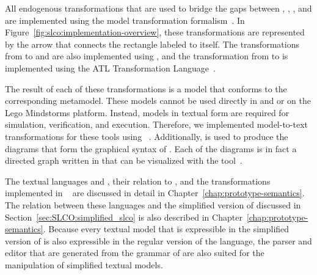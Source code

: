 All endogenous transformations that are used to bridge the gaps between \SLCO, \NQC, \Promela, and \POOSL are implemented using the \Xtend model transformation formalism~\cite{Haase2007OAW}.
In Figure~\ref{fig:slco:implementation-overview}, these transformations are represented by the arrow that connects the rectangle labeled \SLCO to itself.
The transformations from \SLCO to \POOSL and \NQC are also implemented using \Xtend, and the transformation from \SLCO to \Promela is implemented using the ATL Transformation Language~\cite{Jouault2005}.

The result of each of these transformations is a model that conforms to the corresponding metamodel.
These models cannot be used directly in \POOSL and \Spin or on the Lego Mindstorms platform.
Instead, models in textual form are required for simulation, verification, and execution.
Therefore, we implemented model-to-text transformations for these tools using \Xpand~\cite{Haase2007OAW}.
Additionally, \Xpand is used to produce the diagrams that form the graphical syntax of \SLCO.
Each of the diagrams is in fact a directed graph written in \DOT that can be visualized with the \graphviz tool~\cite{Ellson01graphviz}.

The textual languages \CS and \LTS, their relation to \DOT, and the transformations implemented in \ASFSDF~\cite{Brand:2001:ASF} are discussed in detail in Chapter~\ref{chap:prototype-semantics}.
The relation between these languages and the simplified version of \SLCO discussed in Section~\ref{sec:SLCO:simplified_slco} is also described in Chapter~\ref{chap:prototype-semantics}.
Because every textual model that is expressible in the simplified version of \SLCO is also expressible in the regular version of the language, the parser and editor that are generated from the \Xtext grammar of \SLCO are also suited for the manipulation of simplified textual \SLCO models.
